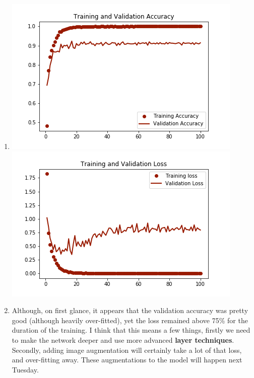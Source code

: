 \documentclass[12pt]{article} %
\begin{document}
\begin{enumerate}[label = (\roman*)]
\item\includegraphics{train-vs-val-acc-med-1}\newline\includegraphics{train-vs-val-loss-med-1}
\item Although, on first glance, it appears that the validation accuracy was pretty good (although heavily over-fitted), yet the loss remained above 75\% for the duration of the training. I think that this means a few things, firstly we need to make the network deeper and use more advanced \textbf{layer techniques}. Secondly, adding image augmentation will certainly take a lot of that loss, and over-fitting away. These augmentations to the model will happen next Tuesday.
\end{enumerate}
\end{document}
